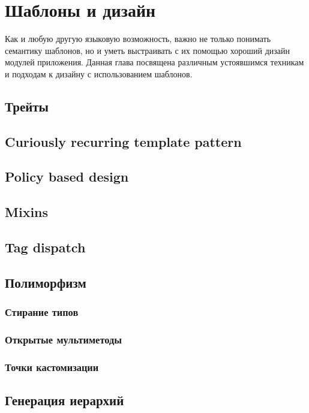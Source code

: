 \chapter{Шаблоны и дизайн}
Как и любую другую языковую возможность, важно не только понимать семантику шаблонов, но и уметь выстраивать с их помощью хороший дизайн модулей приложения.
Данная глава посвящена различным устоявшимся техникам и подходам к дизайну с использованием шаблонов. \cite{ModernCppDesign}

\section{Трейты}

\section{Curiously recurring template pattern}

\section{Policy based design}

\section{Mixins}

\section{Tag dispatch}

\section{Полиморфизм}
\subsection{Стирание типов}

\subsection{Открытые мультиметоды}

\subsection{Точки кастомизации}

\section{Генерация иерархий}

